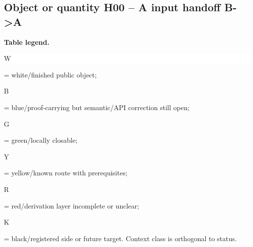 \subsection*{Object or quantity H00 -- A input handoff B->A}
\hypertarget{objproof:H00}{}
\par\smallskip\noindent\begin{minipage}{0.99\linewidth}\footnotesize\raggedright\textbf{Table legend.} \colorbox{white}{\strut W} = white/finished public object; \colorbox{cyan!20}{\strut B} = blue/proof-carrying but semantic/API correction still open; \colorbox{green!18}{\strut G} = green/locally closable; \colorbox{yellow!25}{\strut Y} = yellow/known route with prerequisites; \colorbox{red!20}{\strut R} = red/derivation layer incomplete or unclear; \colorbox{black!18}{\strut K} = black/registered side or future target. Context class is orthogonal to status.\end{minipage}\par\vspace{0.25em}
